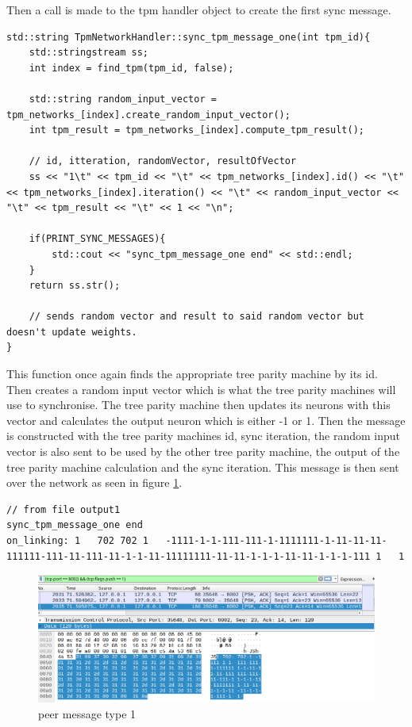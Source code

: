 Then a call is made to the tpm handler object to create the first sync message.
\begin{lstlisting}
std::string TpmNetworkHandler::sync_tpm_message_one(int tpm_id){
	std::stringstream ss;
	int index = find_tpm(tpm_id, false);
	
	std::string random_input_vector = tpm_networks_[index].create_random_input_vector();
	int tpm_result = tpm_networks_[index].compute_tpm_result();
	
	// id, itteration, randomVector, resultOfVector
	ss << "1\t" << tpm_id << "\t" << tpm_networks_[index].id() << "\t" << tpm_networks_[index].iteration() << "\t" << random_input_vector << "\t" << tpm_result << "\t" << 1 << "\n";
	
	if(PRINT_SYNC_MESSAGES){
		std::cout << "sync_tpm_message_one end" << std::endl;
	}
	return ss.str();
	
	// sends random vector and result to said random vector but doesn't update weights.
}   
\end{lstlisting}
This function once again finds the appropriate tree parity machine by its id. Then creates a random input vector which is what the tree parity machines will use to synchronise. The tree parity machine then updates its neurons with this vector and calculates the output neuron which is either -1 or 1. 
Then the message is constructed with the tree parity machines id, sync iteration, the random input vector is also sent to be used by the other tree parity machine, the output of the tree parity machine calculation and the sync iteration. This message is then sent over the network as seen in figure \ref{fig:sync5}.
\begin{lstlisting}
// from file output1
sync_tpm_message_one end
on_linking: 1	702	702	1	-1111-1-1-111-111-1-1111111-1-11-11-11-111111-111-11-111-11-1-1-11-11111111-11-11-1-1-1-11-11-1-1-1-111	1	1
\end{lstlisting}

\begin{figure}[!h]
	\centering
	\includegraphics[width=1\textwidth]{Figures/sync5.png}
	\caption[peer message type 1]{peer message type 1}
	\label{fig:sync5}
\end{figure}
\FloatBarrier

